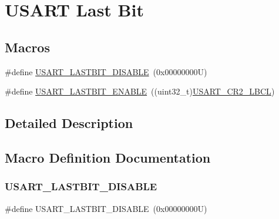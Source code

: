\hypertarget{group___u_s_a_r_t___last___bit}{}\section{U\+S\+A\+RT Last Bit}
\label{group___u_s_a_r_t___last___bit}
\subsection*{Macros}
\begin{DoxyCompactItemize}
\item 
\#define \hyperlink{group___u_s_a_r_t___last___bit_gac96499244ffa44ff6fa739da9cc9d53f}{U\+S\+A\+R\+T\+\_\+\+L\+A\+S\+T\+B\+I\+T\+\_\+\+D\+I\+S\+A\+B\+LE}~(0x00000000\+U)
\item 
\#define \hyperlink{group___u_s_a_r_t___last___bit_gae851e2151668c666028dc10f20f4f676}{U\+S\+A\+R\+T\+\_\+\+L\+A\+S\+T\+B\+I\+T\+\_\+\+E\+N\+A\+B\+LE}~((uint32\+\_\+t)\hyperlink{group___peripheral___registers___bits___definition_ga4a62e93ae7864e89622bdd92508b615e}{U\+S\+A\+R\+T\+\_\+\+C\+R2\+\_\+\+L\+B\+CL})
\end{DoxyCompactItemize}


\subsection{Detailed Description}


\subsection{Macro Definition Documentation}
\mbox{\label{group___u_s_a_r_t___last___bit_gac96499244ffa44ff6fa739da9cc9d53f}} 
\subsubsection{\texorpdfstring{U\+S\+A\+R\+T\+\_\+\+L\+A\+S\+T\+B\+I\+T\+\_\+\+D\+I\+S\+A\+B\+LE}{USART\_LASTBIT\_DISABLE}}
{\footnotesize\ttfamily \#define U\+S\+A\+R\+T\+\_\+\+L\+A\+S\+T\+B\+I\+T\+\_\+\+D\+I\+S\+A\+B\+LE~(0x00000000\+U)}

